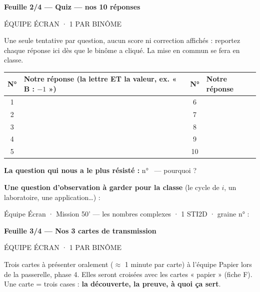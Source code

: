 \documentclass[11pt,a4paper]{article}
\renewcommand{\arraystretch}{1.4}
\newcommand{\pointilles}{\makebox[3.5cm]{\dotfill}}
\newcommand{\feuille}[3]{%
\begin{center}
  {\bfseries\large Feuille #1 --- #2}\\[2pt]
  {\small\colorbox{gray!15}{\parbox{0.5\textwidth}{\centering #3}}}
\end{center}}
\begin{document}
\newpage
\feuille{2/4}{Quiz --- nos 10 réponses}{ÉQUIPE ÉCRAN · 1 PAR BINÔME}

Une seule tentative par question, aucun score ni correction affichés :
reportez chaque réponse ici dès que le binôme a cliqué. La mise en commun se
fera en classe.

\begin{center}
\renewcommand{\arraystretch}{2.4}
\begin{tabular}{|c|p{5.5cm}|c|p{5.5cm}|}
  \hline
  \textbf{N°} & \textbf{Notre réponse (la lettre ET la valeur,
  ex. « B : $-1$ »)} & \textbf{N°} & \textbf{Notre réponse} \\ \hline
  1 & & 6 & \\ \hline
  2 & & 7 & \\ \hline
  3 & & 8 & \\ \hline
  4 & & 9 & \\ \hline
  5 & & 10 & \\ \hline
\end{tabular}
\end{center}

\textbf{La question qui nous a le plus résisté :} n° \pointilles\ ---
pourquoi ?

\pointilles\par\pointilles

\textbf{Une question d'observation à garder pour la classe} (le cycle de $i$,
un laboratoire, une application\dots) :

\pointilles\par\pointilles

\vfill
\begin{center}
\footnotesize Équipe Écran · Mission 50' --- les nombres complexes ·
1 STI2D · graine n° : \pointilles
\end{center}

\newpage
\feuille{3/4}{Nos 3 cartes de transmission}{ÉQUIPE ÉCRAN · 1 PAR BINÔME}

Trois cartes à présenter oralement ($\approx$ 1 minute par carte) à l'équipe
Papier lors de la passerelle, phase 4. Elles seront croisées avec les cartes
« papier » (fiche F). Une carte = trois cases : \textbf{la découverte, la
preuve, à quoi ça sert}.
\end{document}
